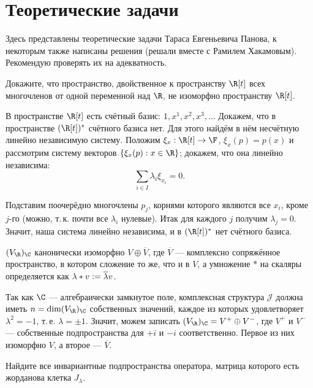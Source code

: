 \section{Теоретические задачи}

Здесь представлены теоретические задачи Тараса Евгеньевича Панова, к некоторым также написаны решения (решали вместе с Рамилем Хакамовым). Рекомендую проверять их на адекватность.

\begin{problem}
    Докажите, что пространство, двойственное к пространству $\R[t]$ всех многочленов от одной переменной над $\R$, не изоморфно пространству $\R[t]$.
\end{problem}

\begin{solution}
    В пространстве $\R[t]$ есть счётный базис: $1, x^1, x^2, x^3, \ldots$ Докажем, что в пространстве $(\R[t])^\ast$ счётного базиса нет. Для этого найдём в нём несчётную линейно независимую систему. Положим $\xi_x: \R[t] \to \F$, $\xi_x(p) = p(x)$ и рассмотрим систему векторов $\{\xi_x(p) : x \in \R\}$; докажем, что она линейно независима:
    \[
        \sum_{i \in I}\lambda_i\xi_{x_i} = 0.
    \]

    Подставим поочерёдно многочлены $p_j$, корнями которого являются все $x_i$, кроме $j$-го (можно, т.\,к. почти все $\lambda_i$ нулевые). Итак для каждого $j$ получим $\lambda_j = 0$. Значит, наша система линейно независима, и в $(\R[t])^\ast$ нет счётного базиса.
\end{solution}

\begin{problem}
    $(V_\R)_\C$ канонически изоморфно $V \oplus \overline{V}$, где $\overline{V}$ --- комплексно сопряжённое пространство, в котором сложение то же, что и в $V$, а умножение $\ast$ на скаляры определяется как $\lambda \ast v \vcentcolon = \overline{\lambda}v$.
\end{problem}

\begin{solution}
    Так как $\C$ --- алгебраически замкнутое поле, комплексная структура $\mathcal{J}$ должна иметь $n = \dim (V_\R)_\C$ собственных значений, каждое из которых удовлетворяет $\lambda^2 = -1$, т.\,е. $\lambda = \pm 1$. Значит, можем записать $(V_\R)_\C = V^+ \oplus V^-$, где $V^+$ и $V^-$ --- собственные подпространства для $+i$ и $-i$ соответственно. Первое из них изоморфно $V$, а второе --- $\overline{V}$.
\end{solution}

\begin{problem}
    Найдите все инвариантные подпространства оператора, матрица которого есть жорданова клетка $J_\lambda$.
\end{problem}

